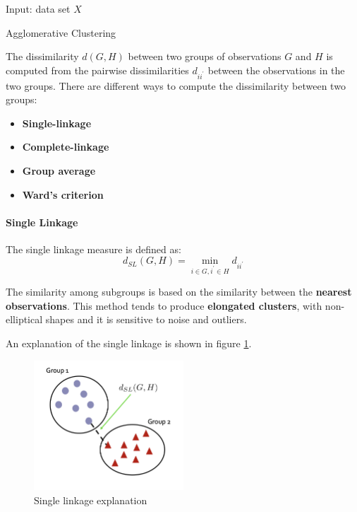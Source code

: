 \begin{algorithm}
    \SetAlgoLined
    Input: data set $X$ \\
    \caption{Agglomerative Clustering}
\end{algorithm}

The dissimilarity $d(G,H)$ between two groups of observations $G$ and $H$ is computed from the pairwise dissimilarities $d_{ii^{\prime}}$ between the observations in the two groups. There are different ways to compute the dissimilarity between two groups:
\begin{itemize}
    \item \textbf{Single-linkage}
    \item \textbf{Complete-linkage}
    \item \textbf{Group average}
    \item \textbf{Ward's criterion}
\end{itemize}

\paragraph*{Single Linkage}
The single linkage measure is defined as:
\[
    d_{SL}(G,H) = \min_{i \in G, i^{\prime} \in H} d_{ii^{\prime}}
\]

The similarity among subgroups is based on the similarity between the \textbf{nearest observations}. This method tends to produce \textbf{elongated clusters}, with non-elliptical shapes and it is sensitive to noise and outliers.

An explanation of the single linkage is shown in figure \ref{fig:singlelinkage}.
\begin{figure}[h]
    \centering
    \includegraphics[width=0.5\textwidth]{./figures/chapter_7/singlelinkage.png}
    \caption{Single linkage explanation}
    \label{fig:singlelinkage}
\end{figure}

